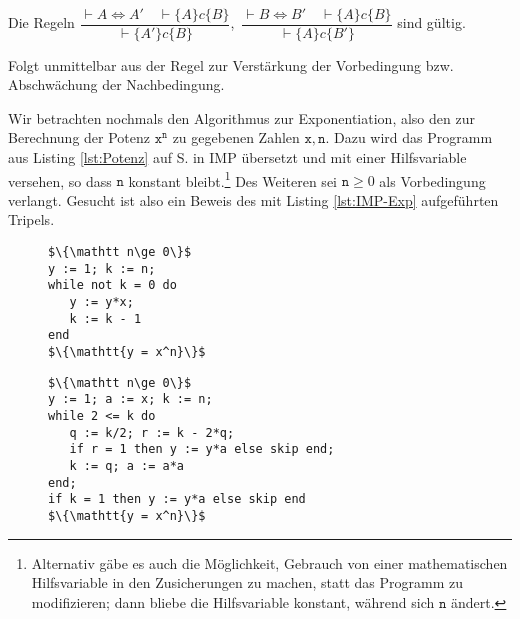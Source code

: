 \begin{Satz}[Ersetzungsregeln]\label{HK-Ersetzung}\mbox{}\\[4pt]
Die Regeln
$\dfrac{\vdash A\Leftrightarrow A'\quad\vdash\{A\}c\{B\}}{
  \vdash\{A'\}c\{B\}}$,\,
$\dfrac{\vdash B\Leftrightarrow B'\quad\vdash\{A\}c\{B\}}{
  \vdash\{A\}c\{B'\}}$ sind gültig.
\end{Satz}
\begin{Beweis}
Folgt unmittelbar aus der Regel zur Verstärkung der
Vorbedingung bzw. Abschwächung der Nachbedingung.\,\qedsymbol
\end{Beweis}

\noindent{}
Wir betrachten nochmals den Algorithmus zur Exponentiation, also den
zur Berechnung der Potenz $\mathtt{x^n}$ zu gegebenen Zahlen $\mathtt{x,n}$.
Dazu wird das Programm aus Listing \ref{lst:Potenz} auf S. \pageref{lst:Potenz}
in IMP übersetzt und mit einer Hilfsvariable versehen, so dass $\mathtt n$
konstant bleibt.\footnote{Alternativ gäbe es auch die Möglichkeit,
Gebrauch von einer mathematischen Hilfsvariable in den Zusicherungen zu
machen, statt das Programm zu modifizieren; dann bliebe die Hilfsvariable
konstant, während sich $\mathtt n$ ändert.} Des Weiteren sei $\mathtt n\ge 0$
als Vorbedingung verlangt. Gesucht ist also ein Beweis des mit Listing
\ref{lst:IMP-Exp} aufgeführten Tripels.

\begin{figure}
\begin{minipage}[t]{.40\textwidth}
\begin{lstlisting}[language=IMP, mathescape, label=lst:IMP-Exp,
caption={\raggedright Berechnung von $x^n$}]
$\{\mathtt n\ge 0\}$
y := 1; k := n;
while not k = 0 do
   y := y*x;
   k := k - 1
end
$\{\mathtt{y = x^n}\}$
\end{lstlisting}
\end{minipage}
\hfill
\begin{minipage}[t]{.56\textwidth}
\begin{lstlisting}[language=IMP, mathescape, label=lst:IMP-ExpBin,
caption={\raggedright Binäre Exponentiation}]
$\{\mathtt n\ge 0\}$
y := 1; a := x; k := n;
while 2 <= k do
   q := k/2; r := k - 2*q;
   if r = 1 then y := y*a else skip end;
   k := q; a := a*a
end;
if k = 1 then y := y*a else skip end
$\{\mathtt{y = x^n}\}$
\end{lstlisting}
\end{minipage}
\end{figure}

